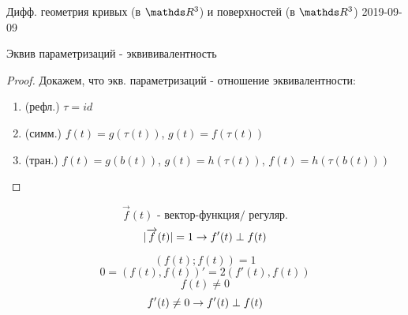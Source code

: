 \documentclass[main, 12pt, fleqn]{subfiles}
\begin{document}
\begin{lect} {Дифф. геометрия кривых (в $\R^3$) и поверхностей (в $\R^3$) 2019-09-09}
\begin{lemma}
	Эквив параметризаций - эквививалентность
\end{lemma}

\begin{proof}
	Докажем, что экв. параметризаций - отношение эквивалентности:
    \begin{enumerate}
        \item (рефл.) $\tau=id$
        \item (симм.) $f(t)=g(\tau(t))$, $g(t)=f(\tau(t))$
        \item (тран.) $f(t)=g(b(t))$, $g(t)=h(\tau(t))$, $f(t)=h(\tau(b(t)))$
    \end{enumerate}
\end{proof}

\begin{Lemma}
	\[\overrightarrow{f}(t) \text{ - вектор-функция/ регуляр.}\]
	\[|\overrightarrow{f}(t)| = 1 \rightarrow f'(t) \perp f(t)\]
\end{Lemma}

\begin{Proof}
	\[(f(t); f(t)) = 1\]
	\[0 = (f(t), f(t))' = 2(f'(t), f(t))\]
	\[f(t) \neq 0\]
	\[f'(t) \neq 0 \rightarrow f'(t) \perp f(t)\]
\end{Proof}
\end{lect}
\end{document}
